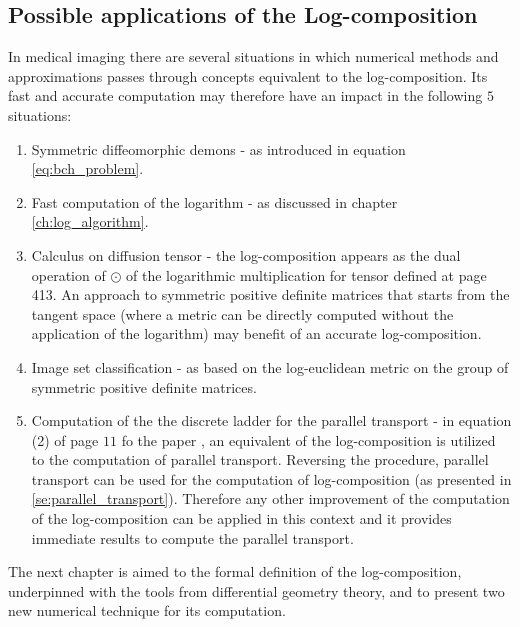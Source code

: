 \subsection{Possible applications of the Log-composition}
In medical imaging there are several situations in which numerical methods and approximations passes through concepts equivalent to the log-composition.
Its fast and accurate computation may therefore have an impact in the following $5$ situations:
\begin{enumerate}
	\item Symmetric diffeomorphic demons \cite{vercauteren08} - as introduced in equation \ref{eq:bch_problem}.
	\item Fast computation of the logarithm \cite{Bossa:08} - as discussed in chapter \ref{ch:log_algorithm}.
	\item Calculus on diffusion tensor \cite{Arsigny:MRM:06} - the log-composition appears as the dual operation of $\odot$ of the logarithmic multiplication for tensor defined at page 413. An approach to symmetric positive definite matrices that starts from the tangent space (where a metric can be directly computed without the application of the logarithm) may benefit of an accurate log-composition.  
	\item Image set classification \cite{huanglog} - as based on the log-euclidean metric on the group of symmetric positive definite matrices.
	\item Computation of the the discrete ladder for the parallel transport - in equation (2) of page $11$ fo the paper \cite{Lorenzi:discrete_ladders:14}, an equivalent of the log-composition is utilized to the computation of parallel transport. Reversing the procedure, parallel transport can be used for the computation of log-composition (as presented in \ref{se:parallel_transport}). Therefore any other improvement of the computation of the log-composition can be applied in this context and it provides immediate results to compute the parallel transport.
\end{enumerate}	
	
The next chapter is aimed to the formal definition of the log-composition, underpinned with the tools from differential geometry theory, and to present two new numerical technique for its computation.







